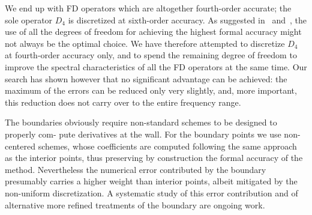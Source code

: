 We end up with FD operators which are altogether fourth-order accurate; the sole operator $D_{4}$ is discretized at sixth-order accuracy. As suggested in~\cite{kim_moin_moser} and~\cite{compact:difference}, the use of all the degrees of freedom for achieving the highest formal accuracy might not always be the optimal choice. We have therefore attempted to discretize $D_{4}$ at fourth-order accuracy only, and to spend the remaining degree of freedom to improve the spectral characteristics of all the FD operators at the same time. Our search has shown however that no significant advantage can be achieved: the maximum of the errors can be reduced only very slightly, and, more important, this reduction does not carry over to the entire frequency range.\par
The boundaries obviously require non-standard schemes to be designed to properly com- pute derivatives at the wall. For the boundary points we use non-centered schemes, whose coefficients are computed following the same approach as the interior points, thus preserving by construction the formal accuracy of the method. Nevertheless the numerical error contributed by the boundary presumably carries a higher weight than interior points, albeit mitigated by the non-uniform discretization. A systematic study of this error contribution and of alternative more refined treatments of the boundary are ongoing work.


